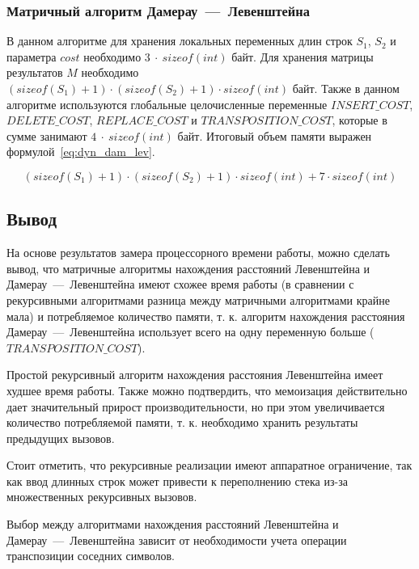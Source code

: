 \subsubsection{Матричный алгоритм Дамерау~---~Левенштейна}

В данном алгоритме для хранения локальных переменных длин строк $S_1$, $S_2$ и параметра $cost$ необходимо $3~\cdot~sizeof(int)$ байт. Для хранения матрицы результатов $M$ необходимо $(sizeof(S_1) + 1) \cdot (sizeof(S_2) + 1) \cdot sizeof(int)$ байт. Также в данном алгоритме используются глобальные целочисленные переменные $INSERT\_COST$, $DELETE\_COST$, $REPLACE\_COST$ и $TRANSPOSITION\_COST$, которые в сумме занимают $4~\cdot~sizeof(int)$ байт. Итоговый объем памяти выражен формулой~\ref{eq:dyn_dam_lev}.

\begin{equation}
    \label{eq:dyn_dam_lev}
    (sizeof(S_1) + 1) \cdot (sizeof(S_2) + 1) \cdot sizeof(int) + 7 \cdot sizeof(int)
\end{equation}

\subsection{Вывод}

На основе результатов замера процессорного времени работы, можно сделать вывод, что матричные алгоритмы нахождения расстояний Левенштейна и Дамерау~---~Левенштейна имеют схожее время работы (в сравнении с рекурсивными алгоритмами разница между матричными алгоритмами крайне мала) и потребляемое количество памяти, т. к. алгоритм нахождения расстояния Дамерау~---~Левенштейна использует всего на одну переменную больше ($TRANSPOSITION\_COST$). 

Простой рекурсивный алгоритм нахождения расстояния Левенштейна имеет худшее время работы. Также можно подтвердить, что мемоизация действительно дает значительный прирост производительности, но при этом увеличивается количество потребляемой памяти, т. к. необходимо хранить результаты предыдущих вызовов. 

Стоит отметить, что рекурсивные реализации имеют аппаратное ограничение, так как ввод длинных строк может привести к переполнению стека из-за множественных рекурсивных вызовов.

Выбор между алгоритмами нахождения расстояний Левенштейна и Дамерау~---~Левенштейна зависит от необходимости учета операции транспозиции соседних символов.
